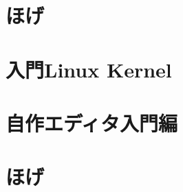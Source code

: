 \documentclass[autodetect-engine,dvipdfmx-if-dvi,ja=standard,a4paper,12pt,twoside,openany,layout=v2]{bxjsbook}
\begin{document}
\chapter{ほげ}


\chapter{入門Linux Kernel}


\chapter{自作エディタ入門編}


\chapter{ほげ}


\newpage
\myimpression
\end{document}
